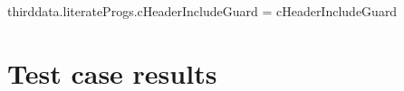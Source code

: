thirddata.literateProgs.cHeaderIncludeGuard = cHeaderIncludeGuard
\stopLuaCode




\section{Test case results}

\reportMkIVStats

\reportLuaStats

\reportFailures

\stopchapter
